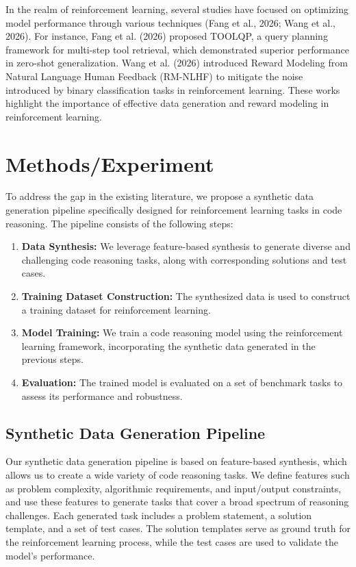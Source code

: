 \documentclass{article}
\begin{document}
In the realm of reinforcement learning, several studies have focused on optimizing model performance through various techniques (Fang et al., 2026; Wang et al., 2026). For instance, Fang et al. (2026) proposed TOOLQP, a query planning framework for multi-step tool retrieval, which demonstrated superior performance in zero-shot generalization. Wang et al. (2026) introduced Reward Modeling from Natural Language Human Feedback (RM-NLHF) to mitigate the noise introduced by binary classification tasks in reinforcement learning. These works highlight the importance of effective data generation and reward modeling in reinforcement learning.

\section{Methods/Experiment}
\label{sec:methods}

To address the gap in the existing literature, we propose a synthetic data generation pipeline specifically designed for reinforcement learning tasks in code reasoning. The pipeline consists of the following steps:

\begin{enumerate}
    \item \textbf{Data Synthesis:} We leverage feature-based synthesis to generate diverse and challenging code reasoning tasks, along with corresponding solutions and test cases.
    \item \textbf{Training Dataset Construction:} The synthesized data is used to construct a training dataset for reinforcement learning.
    \item \textbf{Model Training:} We train a code reasoning model using the reinforcement learning framework, incorporating the synthetic data generated in the previous steps.
    \item \textbf{Evaluation:} The trained model is evaluated on a set of benchmark tasks to assess its performance and robustness.
\end{enumerate}

\subsection{Synthetic Data Generation Pipeline}
Our synthetic data generation pipeline is based on feature-based synthesis, which allows us to create a wide variety of code reasoning tasks. We define features such as problem complexity, algorithmic requirements, and input/output constraints, and use these features to generate tasks that cover a broad spectrum of reasoning challenges. Each generated task includes a problem statement, a solution template, and a set of test cases. The solution templates serve as ground truth for the reinforcement learning process, while the test cases are used to validate the model's performance.
\end{document}
